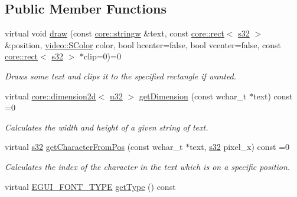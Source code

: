 \subsection*{Public Member Functions}
\begin{DoxyCompactItemize}
\item 
virtual void \hyperlink{classirr_1_1gui_1_1IGUIFont_af5627e546c474f31260fe671c24f9a33}{draw} (const \hyperlink{namespaceirr_1_1core_aef83fafbb1b36fcce44c07c9be23a7f2}{core\+::stringw} \&text, const \hyperlink{classirr_1_1core_1_1rect}{core\+::rect}$<$ \hyperlink{namespaceirr_ac66849b7a6ed16e30ebede579f9b47c6}{s32} $>$ \&position, \hyperlink{classirr_1_1video_1_1SColor}{video\+::\+S\+Color} color, bool hcenter=false, bool vcenter=false, const \hyperlink{classirr_1_1core_1_1rect}{core\+::rect}$<$ \hyperlink{namespaceirr_ac66849b7a6ed16e30ebede579f9b47c6}{s32} $>$ $\ast$clip=0)=0
\begin{DoxyCompactList}\small\item\em Draws some text and clips it to the specified rectangle if wanted. \end{DoxyCompactList}\item 
virtual \hyperlink{classirr_1_1core_1_1dimension2d}{core\+::dimension2d}$<$ \hyperlink{namespaceirr_a0416a53257075833e7002efd0a18e804}{u32} $>$ \hyperlink{classirr_1_1gui_1_1IGUIFont_aa7612db0c9dc2837b44a1a2fa5668797}{get\+Dimension} (const wchar\+\_\+t $\ast$text) const =0
\begin{DoxyCompactList}\small\item\em Calculates the width and height of a given string of text. \end{DoxyCompactList}\item 
virtual \hyperlink{namespaceirr_ac66849b7a6ed16e30ebede579f9b47c6}{s32} \hyperlink{classirr_1_1gui_1_1IGUIFont_a60d4d0465deedd811cd0fecd11b4329f}{get\+Character\+From\+Pos} (const wchar\+\_\+t $\ast$text, \hyperlink{namespaceirr_ac66849b7a6ed16e30ebede579f9b47c6}{s32} pixel\+\_\+x) const =0
\begin{DoxyCompactList}\small\item\em Calculates the index of the character in the text which is on a specific position. \end{DoxyCompactList}\item 
\mbox{\label{classirr_1_1gui_1_1IGUIFont_a3d5a42997a718b510b73e7d6235b993e}} 
virtual \hyperlink{namespaceirr_1_1gui_a3c818a164486f43300260327c5420a2f}{E\+G\+U\+I\+\_\+\+F\+O\+N\+T\+\_\+\+T\+Y\+PE} \hyperlink{classirr_1_1gui_1_1IGUIFont_a3d5a42997a718b510b73e7d6235b993e}{get\+Type} () const

\end{DoxyCompactItemize}
